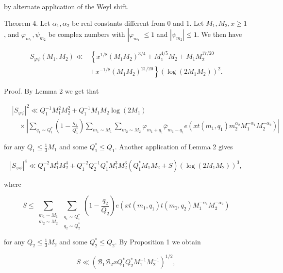 \documentclass[10pt]{article}
\begin{document}
by alternate application of the Weyl shift.

Theorem 4. Let $\alpha_{1}, \alpha_{2}$ be real constants different from 0 and 1. Let $M_{1}, M_{2}, x \geqslant 1$, and $\varphi_{m_{1}}, \psi_{m_{2}}$ be complex numbers with $\left|\varphi_{m_{1}}\right| \leqslant 1$ and $\left|\psi_{m_{2}}\right| \leqslant 1$. We then have

$$
\begin{aligned}
S_{\varphi \psi}\left(M_{1}, M_{2}\right)\ll & \left\{x^{1 / 8}\left(M_{1} M_{2}\right)^{3 / 4}+M_{1}^{4 / 5} M_{2}+M_{1} M_{2}^{17 / 20}\right. \\
& \left.+x^{-1 / 8}\left(M_{1} M_{2}\right)^{21 / 20}\right\}\left(\log\left(2 M_{1} M_{2}\right)\right)^{2} .
\end{aligned}
$$

Proof. By Lemma 2 we get that

$$
\begin{aligned}
& \left|S_{\varphi \psi}\right|^{2} \ll Q_{1}^{-1} M_{1}^{2} M_{2}^{2}+Q_{1}^{-1} M_{1} M_{2}\log(2 M_{1}) \\
& \quad\times\left|\sum_{q_{1} \sim Q_{1}^{*}}\left(1-\frac{q_{1}}{Q_{1}^{*}}\right) \sum_{m_{1} \sim M_{1}} \sum_{m_{2} \sim M_{2}} \varphi_{m_{1}+q_{1}} \overline{\varphi}_{m_{1}-q_{1}} e\left(x t\left(m_{1}, q_{1}\right) m_{2}^{\alpha_{2}} M_{1}^{-\alpha_{1}} M_{2}^{-\alpha_{2}}\right)\right|
\end{aligned}
$$

for any $Q_{1} \leqslant \frac{1}{3} M_{1}$ and some $Q_{1}^{*} \leqslant Q_{1}$. Another application of Lemma 2 gives

$$
\left|S_{\varphi \psi}\right|^{4} \ll Q_{1}^{-2} M_{1}^{4} M_{2}^{4}+Q_{1}^{-2} Q_{2}^{-1} Q_{1}^{*} M_{1}^{3} M_{2}^{3}\left(Q_{1}^{*} M_{1} M_{2}+S\right)\left(\log\left(2 M_{1} M_{2}\right)\right)^{3},
$$

where

$$
S \leqslant \sum_{\substack{m_{1} \sim M_{1} \\ m_{2} \sim M_{2}}} \sum_{\substack{q_{1} \sim Q_{1}^{*} \\ q_{2} \sim Q_{2}^{*}}}\left(1-\frac{q_{2}}{Q_{2}}\right) e\left(x t\left(m_{1}, q_{1}\right) t\left(m_{2}, q_{2}\right) M_{1}^{-\alpha_{1}} M_{2}^{-\alpha_{2}}\right)
$$

for any $Q_{2} \leqslant \frac{1}{3} M_{2}$ and some $Q_{2}^{*} \leqslant Q_{2}$. By Proposition 1 we obtain

$$
S \ll\left(\mathscr{B}_{1} \mathscr{B}_{2} x Q_{1}^{*} Q_{2}^{*} M_{1}^{-1} M_{2}^{-1}\right)^{1 / 2},
$$
\end{document}
